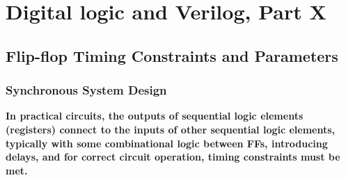 \documentclass[12pt,openany]{book}
\begin{document}
\chapter{Digital logic and Verilog, Part X}
\section{Flip-flop Timing
Constraints and Parameters}
\subsection{Synchronous System Design}
\textbf{In practical circuits, the outputs of sequential logic elements (registers) connect to the inputs of other sequential logic elements, typically with some combinational logic between FFs, introducing delays, and for correct circuit operation, timing constraints must be met.}
\end{document}
